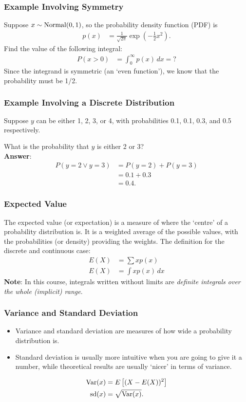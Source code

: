\documentclass{beamer}
\newcommand{\Var}{\textnormal{Var}}
\begin{document}
\begin{frame}
\frametitle{Example Involving Symmetry}
Suppose $x \sim \textnormal{Normal}(0, 1)$, so the probability density function
(PDF) is
\begin{align}
p(x) &= \frac{1}{\sqrt{2\pi}}\exp\left(-\frac{1}{2}x^2\right).
\end{align}
Find the value of the following integral:
\begin{align}
P(x > 0) &= \int_0^\infty p(x) \, dx = ?
\end{align}\pause
Since the integrand is symmetric (an `even function'), we know that the
probability must be 1/2.

\end{frame}


\begin{frame}
\frametitle{Example Involving a Discrete Distribution}
Suppose $y$ can be either 1, 2, 3, or 4, with probabilities
0.1, 0.1, 0.3, and 0.5 respectively.\pause

What is the probability that $y$ is either 2 or 3?\\\pause
{\bf Answer}:
\begin{align}
P(y = 2 \vee y=3) &= P(y=2) + P(y=3) \\
                  &= 0.1 + 0.3 \\
                  &= 0.4.
\end{align}

\end{frame}


\begin{frame}
\frametitle{Expected Value}
The expected value (or expectation) is a measure of where the
`centre' of a probability distribution is. It is a weighted average
of the possible values, with the probabilities (or density) providing
the weights. The definition for the discrete and continuous case:
\begin{align}
E(X) &= \sum x p(x) \\
E(X) &= \int x p(x) \, dx
\end{align}\pause
{\bf Note}: In this course, integrals written without limits are
{\em definite integrals over the whole (implicit) range}.

\end{frame}


\begin{frame}
\frametitle{Variance and Standard Deviation}
\begin{itemize}
\item Variance and standard deviation are measures of how wide
a probability distribution is.\pause
\item Standard deviation is usually more intuitive
when you are going to give it a number, while theoretical
results are usually `nicer' in terms of variance.\pause
\end{itemize}
\begin{align}
\Var(x) &= E\left[(X - E(X))^2\right] \\
\textnormal{sd}(x) &= \sqrt{\Var(x)}.
\end{align}

\end{frame}
\end{document}
